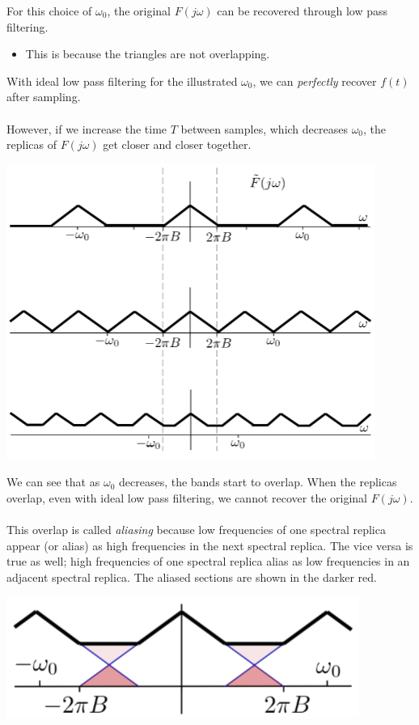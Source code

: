 \documentclass[10pt]{article}
\begin{document}
For this choice of $\omega_0$, the original $F(j\omega)$ can be recovered through low pass filtering.
\begin{itemize}
    \item This is because the triangles are not overlapping.
\end{itemize}
With ideal low pass filtering for the illustrated $\omega_0$, we can \textit{perfectly} recover $f(t)$ after sampling.\\\\
However, if we increase the time $T$ between samples, which decreases $\omega_0$, the replicas of $F(j\omega)$ get closer and closer together.
\begin{center}
    \includegraphics*[scale=0.8]{W8_12.png}
\end{center}
We can see that as $\omega_0$ decreases, the bands start to overlap.  When the replicas overlap, even with ideal low pass filtering, we cannot recover the original $F(j\omega)$.\\\\
This overlap is called \textit{aliasing} because low frequencies of one spectral replica appear (or alias) as high frequencies in the next spectral replica.  The vice versa is true as well; high frequencies of one spectral replica alias as low frequencies in an adjacent spectral replica.  The aliased sections are shown in the darker red.
\begin{center}
    \includegraphics*[scale=0.8]{W8_13.png}
\end{center}
\end{document}
